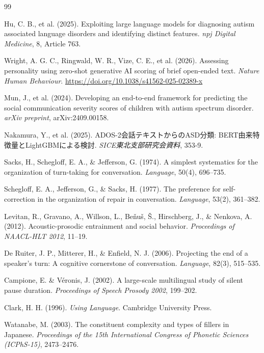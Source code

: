 \documentclass[dvipdfmx,11pt,a4paper]{bxjsarticle}
\renewcommand{\_}{\paperorigunderscore\allowbreak}%
\begin{document}
\begin{thebibliography}{99}

Hu, C. B., et al. (2025).
Exploiting large language models for diagnosing autism associated language disorders and identifying distinct features.
\textit{npj Digital Medicine}, 8, Article 763.

Wright, A. G. C., Ringwald, W. R., Vize, C. E., et al. (2026).
Assessing personality using zero-shot generative AI scoring of brief open-ended text.
\textit{Nature Human Behaviour}.
\url{https://doi.org/10.1038/s41562-025-02389-x}

Mun, J., et al. (2024).
Developing an end-to-end framework for predicting the social communication severity scores of children with autism spectrum disorder.
\textit{arXiv preprint}, arXiv:2409.00158.

Nakamura, Y., et al. (2025).
ADOS-2会話テキストからのASD分類: BERT由来特徴量とLightGBMによる検討.
\textit{SICE東北支部研究会資料}, 353-9.

Sacks, H., Schegloff, E. A., \& Jefferson, G. (1974).
A simplest systematics for the organization of turn-taking for conversation.
\textit{Language}, 50(4), 696--735.

Schegloff, E. A., Jefferson, G., \& Sacks, H. (1977).
The preference for self-correction in the organization of repair in conversation.
\textit{Language}, 53(2), 361--382.

Levitan, R., Gravano, A., Willson, L., Beňuš, Š., Hirschberg, J., \& Nenkova, A. (2012).
Acoustic-prosodic entrainment and social behavior.
\textit{Proceedings of NAACL-HLT 2012}, 11--19.

De Ruiter, J. P., Mitterer, H., \& Enfield, N. J. (2006).
Projecting the end of a speaker's turn: A cognitive cornerstone of conversation.
\textit{Language}, 82(3), 515--535.

Campione, E. \& Véronis, J. (2002).
A large-scale multilingual study of silent pause duration.
\textit{Proceedings of Speech Prosody 2002}, 199--202.

Clark, H. H. (1996).
\textit{Using Language}.
Cambridge University Press.

Watanabe, M. (2003).
The constituent complexity and types of fillers in Japanese.
\textit{Proceedings of the 15th International Congress of Phonetic Sciences (ICPhS-15)}, 2473--2476.


\end{thebibliography}
\end{document}

